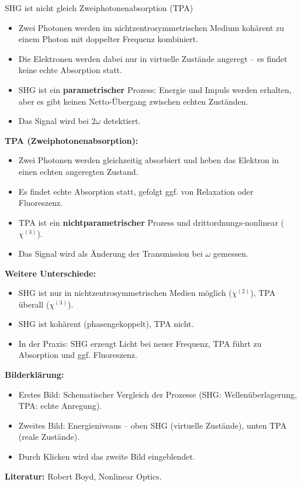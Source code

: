 \documentclass[aspectratio=169]{beamer} %
\begin{document}
\begin{frame}[noframenumbering]{SHG ist nicht gleich Zweiphotonenabsorption (TPA)}
{    \begin{itemize}
      \item Zwei Photonen werden im nichtzentrosymmetrischen Medium kohärent zu einem Photon mit doppelter Frequenz kombiniert.
      \item Die Elektronen werden dabei nur in virtuelle Zustände angeregt – es findet keine echte Absorption statt.
      \item SHG ist ein \textbf{parametrischer} Prozess: Energie und Impuls werden erhalten, aber es gibt keinen Netto-Übergang zwischen echten Zuständen.
      \item Das Signal wird bei $2\omega$ detektiert.
    \end{itemize}
    \textbf{TPA (Zweiphotonenabsorption):}
    \begin{itemize}
      \item Zwei Photonen werden gleichzeitig absorbiert und heben das Elektron in einen echten angeregten Zustand.
      \item Es findet echte Absorption statt, gefolgt ggf. von Relaxation oder Fluoreszenz.
      \item TPA ist ein \textbf{nichtparametrischer} Prozess und drittordnungs-nonlinear ($\chi^{(3)}$).
      \item Das Signal wird als Änderung der Transmission bei $\omega$ gemessen.
    \end{itemize}
    \textbf{Weitere Unterschiede:}
    \begin{itemize}
      \item SHG ist nur in nichtzentrosymmetrischen Medien möglich ($\chi^{(2)}$), TPA überall ($\chi^{(3)}$).
      \item SHG ist kohärent (phasengekoppelt), TPA nicht.
      \item In der Praxis: SHG erzeugt Licht bei neuer Frequenz, TPA führt zu Absorption und ggf. Fluoreszenz.
    \end{itemize}
    \textbf{Bilderklärung:}
    \begin{itemize}
      \item Erstes Bild: Schematischer Vergleich der Prozesse (SHG: Wellenüberlagerung, TPA: echte Anregung).
      \item Zweites Bild: Energieniveaus – oben SHG (virtuelle Zustände), unten TPA (reale Zustände).
      \item Durch Klicken wird das zweite Bild eingeblendet.
    \end{itemize}
    \textbf{Literatur:} Robert Boyd, Nonlinear Optics.
  }
\end{frame}
\end{document}
